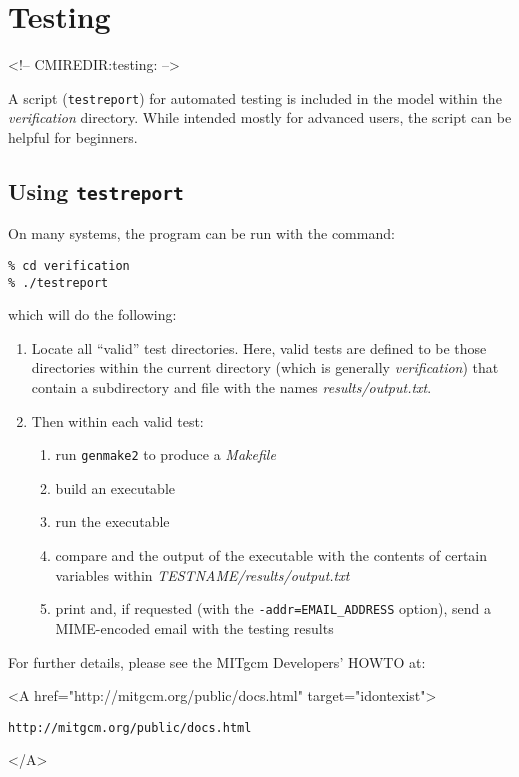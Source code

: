 
\section{Testing}
\label{sect:testing}
\label{www:testing}
\begin{rawhtml}
<!-- CMIREDIR:testing: -->
\end{rawhtml}

A script (\texttt{testreport}) for automated testing is included in
the model within the {\em verification} directory.  While intended
mostly for advanced users, the script can be helpful for beginners.

\subsection{Using \texttt{testreport}}

On many systems, the program can be run with the command:
\begin{verbatim}
% cd verification
% ./testreport
\end{verbatim}
which will do the following:
\begin{enumerate}
\item Locate all ``valid'' test directories.  Here, valid tests are
  defined to be those directories within the current directory (which
  is generally {\em verification}) that contain a subdirectory and
  file with the names {\em results/output.txt}.

\item Then within each valid test:
  \begin{enumerate}
  \item run \texttt{genmake2} to produce a {\em Makefile}
  \item build an executable
  \item run the executable
  \item compare and the output of the executable with the
    contents of certain variables within {\em
      TESTNAME/results/output.txt}
  \item print and, if requested (with the
    \texttt{-addr=EMAIL\_ADDRESS} option), send a MIME-encoded email
    with the testing results
  \end{enumerate}

\end{enumerate}

For further details, please see the MITgcm Developers' HOWTO at:
\begin{rawhtml} <A href="http://mitgcm.org/public/docs.html" target="idontexist"> \end{rawhtml}
\begin{verbatim}
http://mitgcm.org/public/docs.html
\end{verbatim}
\begin{rawhtml} </A> \end{rawhtml}


